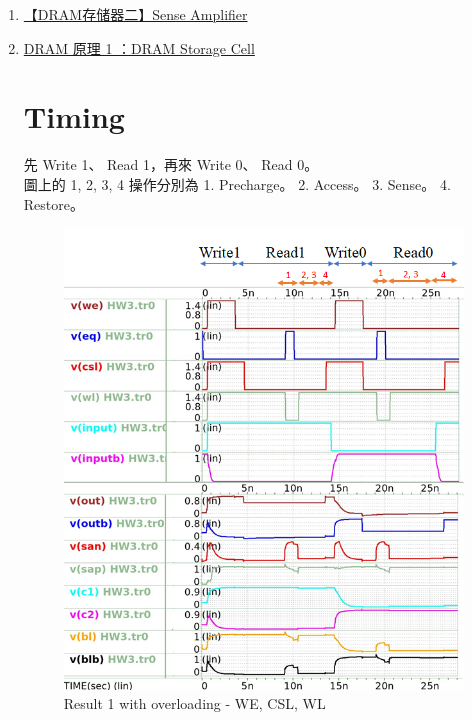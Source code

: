 \documentclass{article}
\begin{document}
  \begin{enumerate}
  
  \item\href{https://blog.csdn.net/highman110/article/details/131242849}{【DRAM存储器二】Sense Amplifier}
  \item\href{http://www.wowotech.net/basic_tech/307.html}{DRAM 原理 1 ：DRAM Storage Cell}


\clearpage
\section{Timing}

先 Write 1、 Read 1，再來 Write 0、 Read 0。\\
圖上的 1, 2, 3, 4 操作分別為
1.	Precharge。
2.	Access。
3.	Sense。
4.	Restore。

\begin{figure}[H]
  \centering
  \includegraphics[width = \linewidth]{./img/2023-11-30-22-21-41.png}
  \caption{Result 1 with overloading - WE, CSL, WL}
  \label{1}
  \end{figure}

\clearpage


\end{enumerate}
\end{document}
